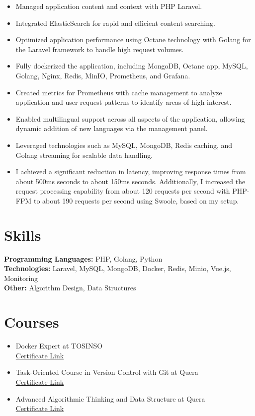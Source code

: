\documentclass[10pt, letterpaper]{article}
\begin{document}
\begin{itemize}[leftmargin=*]
\begin{itemize}[leftmargin=1em]
        \item Managed application content and context with PHP Laravel.
        \item Integrated ElasticSearch for rapid and efficient content searching.
        \item Optimized application performance using Octane technology with Golang for the Laravel framework to handle high request volumes.
        \item Fully dockerized the application, including MongoDB, Octane app, MySQL, Golang, Nginx, Redis, MinIO, Prometheus, and Grafana.
        \item Created metrics for Prometheus with cache management to analyze application and user request patterns to identify areas of high interest.
        \item Enabled multilingual support across all aspects of the application, allowing dynamic addition of new languages via the management panel.
        \item Leveraged technologies such as MySQL, MongoDB, Redis caching, and Golang streaming for scalable data handling.
        \item I achieved a significant reduction in latency, improving response times from about 500ms seconds to about 150ms seconds. Additionally, I increased the request processing capability from about 120 requests per second with PHP-FPM to about 190 requests per second using Swoole, based on my setup.
    \end{itemize}
\end{itemize}

\section{Skills}
\textbf{Programming Languages:} PHP, Golang, Python \\
\textbf{Technologies:} Laravel, MySQL, MongoDB, Docker, Redis, Minio, Vue.js, Monitoring \\
\textbf{Other:} Algorithm Design, Data Structures

\section{Courses}
\begin{itemize}[leftmargin=*]
    \item Docker Expert at TOSINSO \\
    \href{https://tosinso.com/files/get/f6a4dee5-402f-4b49-9b25-bdc06fb2a464}{Certificate Link}
    \item Task-Oriented Course in Version Control with Git at Quera \\
    \href{https://quera.org/certificate/AMBOBgnQ/}{Certificate Link}
    \item Advanced Algorithmic Thinking and Data Structure at Quera \\
    \href{https://quera.org/certificate/qNltcusF/}{Certificate Link}
\end{itemize}
\end{document}

